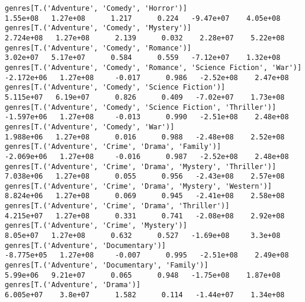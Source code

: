 \documentclass[11pt]{article}
\begin{document}
\begin{Verbatim}[commandchars=\\\{\}]
genres[T.('Adventure', 'Comedy', 'Horror')]                                                                    1.55e+08   1.27e+08      1.217      0.224   -9.47e+07    4.05e+08
genres[T.('Adventure', 'Comedy', 'Mystery')]                                                                  2.724e+08   1.27e+08      2.139      0.032    2.28e+07    5.22e+08
genres[T.('Adventure', 'Comedy', 'Romance')]                                                                   3.02e+07   5.17e+07      0.584      0.559   -7.12e+07    1.32e+08
genres[T.('Adventure', 'Comedy', 'Romance', 'Science Fiction', 'War')]                                       -2.172e+06   1.27e+08     -0.017      0.986   -2.52e+08    2.47e+08
genres[T.('Adventure', 'Comedy', 'Science Fiction')]                                                          5.115e+07   6.19e+07      0.826      0.409   -7.02e+07    1.73e+08
genres[T.('Adventure', 'Comedy', 'Science Fiction', 'Thriller')]                                             -1.597e+06   1.27e+08     -0.013      0.990   -2.51e+08    2.48e+08
genres[T.('Adventure', 'Comedy', 'War')]                                                                      1.988e+06   1.27e+08      0.016      0.988   -2.48e+08    2.52e+08
genres[T.('Adventure', 'Crime', 'Drama', 'Family')]                                                          -2.069e+06   1.27e+08     -0.016      0.987   -2.52e+08    2.48e+08
genres[T.('Adventure', 'Crime', 'Drama', 'Mystery', 'Thriller')]                                              7.038e+06   1.27e+08      0.055      0.956   -2.43e+08    2.57e+08
genres[T.('Adventure', 'Crime', 'Drama', 'Mystery', 'Western')]                                               8.824e+06   1.27e+08      0.069      0.945   -2.41e+08    2.58e+08
genres[T.('Adventure', 'Crime', 'Drama', 'Thriller')]                                                         4.215e+07   1.27e+08      0.331      0.741   -2.08e+08    2.92e+08
genres[T.('Adventure', 'Crime', 'Mystery')]                                                                    8.05e+07   1.27e+08      0.632      0.527   -1.69e+08     3.3e+08
genres[T.('Adventure', 'Documentary')]                                                                       -8.775e+05   1.27e+08     -0.007      0.995   -2.51e+08    2.49e+08
genres[T.('Adventure', 'Documentary', 'Family')]                                                               5.99e+06   9.21e+07      0.065      0.948   -1.75e+08    1.87e+08
genres[T.('Adventure', 'Drama')]                                                                              6.005e+07    3.8e+07      1.582      0.114   -1.44e+07    1.34e+08

\end{Verbatim}
\end{document}
